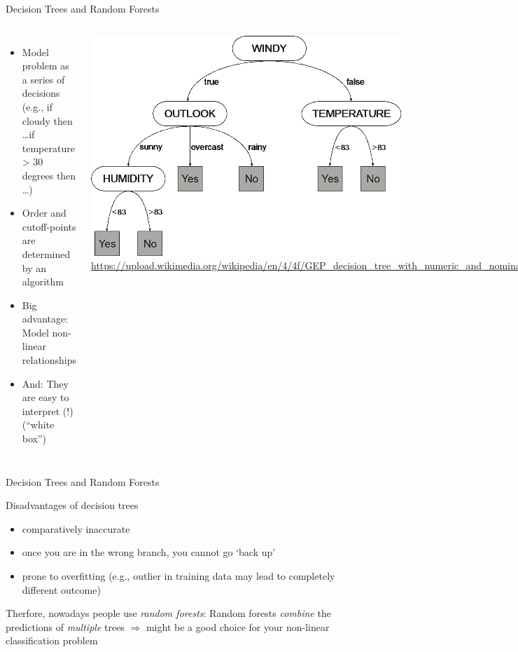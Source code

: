 \documentclass[compress]{beamer}
\begin{document}
\begin{frame}{Decision Trees and Random Forests}
	\begin{columns}
		\begin{itemize}[<+->]
			\item Model problem as a series of decisions (e.g., if cloudy then \ldots if temperature > 30 degrees then \ldots)
			\item Order and cutoff-points are determined by an algorithm
			\item Big advantage: Model non-linear relationships
			\item And: They are easy to interpret (!) (``white box'')
		\end{itemize}
		\includegraphics[width=.8\linewidth,height=.5\paperheight,keepaspectratio]{../pictures/decisiontree}
		\tiny{\url{https://upload.wikimedia.org/wikipedia/en/4/4f/GEP\_decision\_tree\_with\_numeric\_and\_nominal\_attributes.png}}
	\end{columns}
\end{frame}
\begin{frame}{Decision Trees and Random Forests}
	\begin{block}{Disadvantages of decision trees}
		\begin{itemize}
			\item comparatively inaccurate
			\item once you are in the wrong branch, you cannot go `back up'
			\item prone to overfitting (e.g., outlier in training data may lead to completely different outcome)
		\end{itemize}
	\end{block}
	\pause
	Therfore, nowadays people use \emph{random forests}: Random forests \emph{combine} the predictions of \emph{multiple} trees
	$\Rightarrow$ might be a good choice for your non-linear classification problem
\end{frame}
\end{document}
